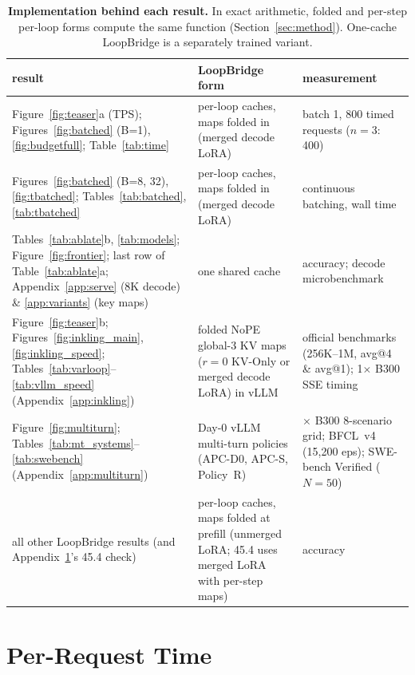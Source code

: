 \documentclass[11pt]{article}
\begin{document}
\begin{table}[h]
\centering\footnotesize
\setlength\tabcolsep{2.5pt}
\begin{tabular}{@{}>{\raggedright\arraybackslash}p{}>{\raggedright\arraybackslash}p{}>{\raggedright\arraybackslash}p{}@{}}
\toprule
result & LoopBridge form & measurement \\
\midrule
Figure~\ref{fig:teaser}a (TPS); Figures~\ref{fig:batched} (B=1), \ref{fig:budgetfull}; Table~\ref{tab:time} & per-loop caches, maps folded in (merged decode LoRA) & batch 1, 800 timed requests ($n{=}3$: 400) \\
\addlinespace[4pt]
Figures~\ref{fig:batched} (B=8, 32), \ref{fig:tbatched}; Tables~\ref{tab:batched}, \ref{tab:tbatched} & per-loop caches, maps folded in (merged decode LoRA) & continuous batching, wall time \\
\addlinespace[4pt]
Tables~\ref{tab:ablate}b, \ref{tab:models}; Figure~\ref{fig:frontier}; last row of Table~\ref{tab:ablate}a; Appendix~\ref{app:serve} (8K decode) \& \ref{app:variants} (key maps) & one shared cache & accuracy; decode microbenchmark \\
\addlinespace[4pt]
Figure~\ref{fig:teaser}b; Figures~\ref{fig:inkling_main}, \ref{fig:inkling_speed}; Tables~\ref{tab:varloop}--\ref{tab:vllm_speed} (Appendix~\ref{app:inkling}) & folded NoPE global-3 KV maps ($r{=}0$ KV-Only or merged decode LoRA) in vLLM & 5 official benchmarks (256K--1M, avg@4 \& avg@1); 1$\times$ B300 SSE timing \\
\addlinespace[4pt]
Figure~\ref{fig:multiturn}; Tables~\ref{tab:mt_systems}--\ref{tab:swebench} (Appendix~\ref{app:multiturn}) & Day-0 vLLM multi-turn policies (APC-D0, APC-S, Policy~R) & 1$\times$ B300 8-scenario grid; BFCL~v4 (15,200 eps); SWE-bench Verified ($N{=}50$) \\
\addlinespace[4pt]
all other LoopBridge results (and Appendix~\ref{app:time}'s 45.4 check) & per-loop caches, maps folded at prefill (unmerged LoRA; 45.4 uses merged LoRA with per-step maps) & accuracy \\
\bottomrule
\end{tabular}
\caption{\textbf{Implementation behind each result.} In exact arithmetic, folded and per-step per-loop forms compute the
same function (Section~\ref{sec:method}). One-cache LoopBridge is a separately trained variant.}
\label{tab:impl}
\end{table}

\section{Per-Request Time}
\label{app:time}
\end{document}
